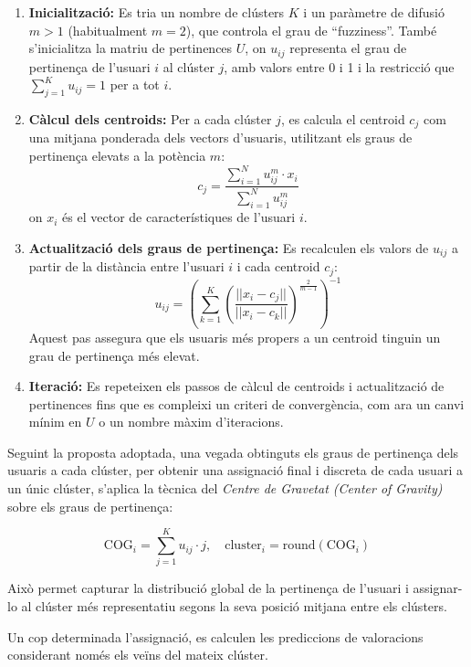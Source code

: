 \documentclass[a4paper,12pt]{report}
\begin{document}
\begin{enumerate}
    \item \textbf{Inicialització:} Es tria un nombre de clústers \( K \) i un paràmetre de difusió \( m > 1 \) (habitualment \( m = 2 \)), que controla el grau de “fuzziness”. També s’inicialitza la matriu de pertinences \( U \), on \( u_{ij} \) representa el grau de pertinença de l’usuari \( i \) al clúster \( j \), amb valors entre 0 i 1 i la restricció que \( \sum_{j=1}^{K} u_{ij} = 1 \) per a tot \( i \).
    
    \item \textbf{Càlcul dels centroids:} Per a cada clúster \( j \), es calcula el centroid \( c_j \) com una mitjana ponderada dels vectors d’usuaris, utilitzant els graus de pertinença elevats a la potència \( m \):
    \[
    c_j = \frac{\sum_{i=1}^{N} u_{ij}^m \cdot x_i}{\sum_{i=1}^{N} u_{ij}^m}
    \]
    on \( x_i \) és el vector de característiques de l’usuari \( i \).

    \item \textbf{Actualització dels graus de pertinença:} Es recalculen els valors de \( u_{ij} \) a partir de la distància entre l’usuari \( i \) i cada centroid \( c_j \):
    \[
    u_{ij} = \left( \sum_{k=1}^{K} \left( \frac{||x_i - c_j||}{||x_i - c_k||} \right)^{\frac{2}{m-1}} \right)^{-1}
    \]
    Aquest pas assegura que els usuaris més propers a un centroid tinguin un grau de pertinença més elevat.

    \item \textbf{Iteració:} Es repeteixen els passos de càlcul de centroids i actualització de pertinences fins que es compleixi un criteri de convergència, com ara un canvi mínim en \( U \) o un nombre màxim d’iteracions.
\end{enumerate}

Seguint la proposta adoptada, una vegada obtinguts els graus de pertinença dels usuaris a cada clúster, per obtenir una assignació final i discreta de cada usuari a un únic clúster, s’aplica la tècnica del \textit{Centre de Gravetat (Center of Gravity)} sobre els graus de pertinença:

\[
\text{COG}_i = \sum_{j=1}^{K} u_{ij} \cdot j, \quad \text{cluster}_i = \text{round}(\text{COG}_i)
\]

Això permet capturar la distribució global de la pertinença de l’usuari i assignar-lo al clúster més representatiu segons la seva posició mitjana entre els clústers.

Un cop determinada l’assignació, es calculen les prediccions de valoracions considerant només els veïns del mateix clúster.
\end{document}
